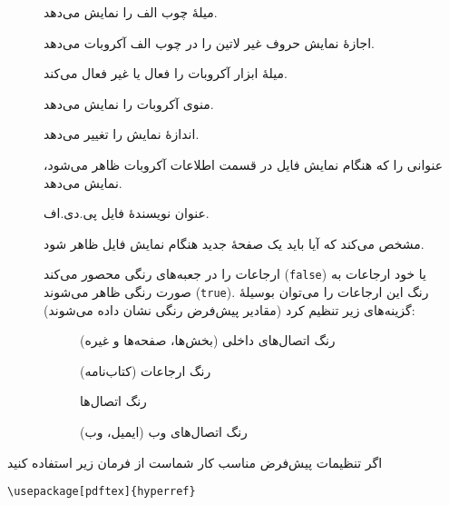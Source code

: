 \begin{flushleft}
\begin{description}
  \item [] میلهٔ چوب الف را نمایش می‌دهد.
  \item [] اجازهٔ نمایش حروف غیر لاتین را در چوب الف آکروبات می‌دهد.
  \item [] میلهٔ ابزار آکروبات را فعال یا غیر فعال می‌کند.
  \item [] منوی آکروبات را نمایش می‌دهد.
  \item [] اندازهٔ نمایش را تغییر می‌دهد.
  \item [] عنوانی را که هنگام نمایش فایل در قسمت اطلاعات آکروبات ظاهر می‌شود، نمایش می‌دهد.
  \item [] عنوان نویسندهٔ فایل پی.دی.اف.
  \item [] مشخص می‌کند که آیا باید یک صفحهٔ جدید هنگام نمایش فایل ظاهر شود.
  \item [] ارجاعات را در جعبه‌های رنگی محصور می‌کند (\texttt{false}) یا خود ارجاعات به صورت رنگی ظاهر می‌شوند  (\texttt{true}). رنگ این ارجاعات را می‌توان بوسیلهٔ گزینه‌های زیر تنظیم کرد 
  (مقادیر پیش‌فرض رنگی نشان داده می‌شوند):
    \begin{description}
    \item [] رنگ  اتصال‌های داخلی 
    (بخش‌ها، صفحه‌ها و غیره)
    \item [] رنگ ارجاعات 
    (کتاب‌نامه)
    \item [] رنگ اتصال‌ها
    \item [] رنگ اتصال‌های وب 
    (ایمیل، وب)
    \end{description}
\end{description}
\end{flushleft}
اگر تنظیمات پیش‌فرض مناسب کار شماست از فرمان زیر استفاده کنید
\begin{code}
\begin{verbatim}
\usepackage[pdftex]{hyperref}
\end{verbatim}
\end{code}

